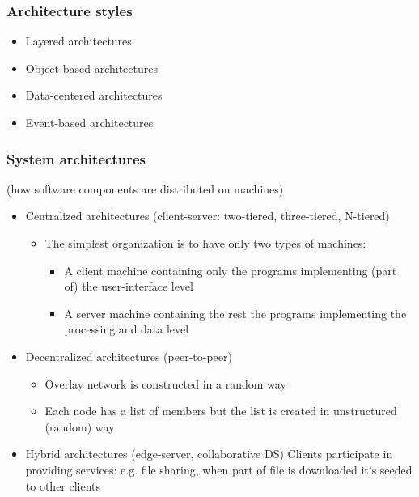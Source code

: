\subsubsection{Architecture styles}
\begin{itemize}
	\item Layered architectures
	\item Object-based architectures
	\item Data-centered architectures
	\item Event-based architectures
\end{itemize}

\subsubsection{System architectures}
(how software components are distributed on machines)
\begin{itemize}
	\item Centralized architectures (client-server: two-tiered, three-tiered, N-tiered)
	\begin{itemize}
		\item The simplest organization is to have only two types of machines:
		\begin{itemize}
			\item A client machine containing only the programs implementing (part of) the user-interface level
			\item A server machine containing the rest
			\subitem the programs implementing the processing and data level
		\end{itemize}
	\end{itemize}
	\item Decentralized architectures (peer-to-peer)
	\begin{itemize}
		\item Overlay network is constructed in a random way
		\item Each node has a list of members but the list is created in unstructured (random) way
	\end{itemize}
	\item Hybrid architectures (edge-server, collaborative DS)
	\subitem Clients participate in providing services: e.g. file sharing, when part of file is downloaded it's seeded to other clients
\end{itemize}
